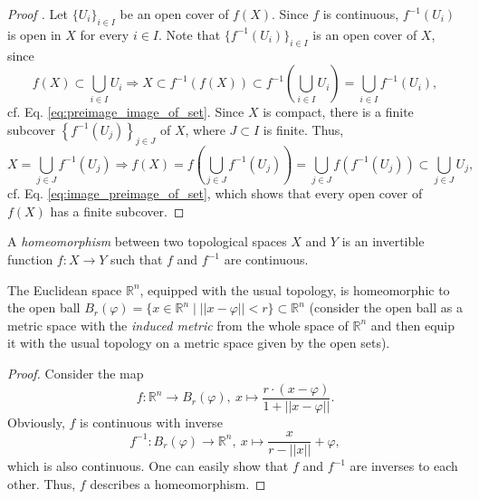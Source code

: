\begin{proof}[Proof \cite{226328}]
	Let $\{U_i\}_{i\in I}$ be an open cover of $f(X)$. Since $f$ is continuous, $f^{-1}(U_i)$ is open in $X$ for every $i\in I$. Note that $\{f^{-1}(U_i)\}_{i\in I}$ is an open cover of $X$, since  $$f(X)\subset \bigcup_{i\in I}U_i\Rightarrow X\subset f^{-1}(f(X))\subset f^{-1}\left(\bigcup_{i\in I}U_i\right) = \bigcup_{i\in I}f^{-1}(U_i),$$ cf. Eq. \eqref{eq:preimage_image_of_set}. Since $X$ is compact, there is a finite subcover $\left\{f^{-1}(U_j)\right\}_{j\in J}$ of $X$, where $J\subset I$ is finite. Thus,
	$$X = \bigcup_{j\in J}f^{-1}(U_j)\Rightarrow f(X) = f\left(\bigcup_{j\in J}f^{-1}(U_j)\right) = \bigcup_{j\in J}f(f^{-1}(U_j))\subset \bigcup_{j\in J}U_j,$$
	cf. Eq. \eqref{eq:image_preimage_of_set}, which shows that every open cover of $f(X)$ has a finite subcover.
\end{proof}

\begin{defn} A \textit{homeomorphism} between two topological spaces $X$ and $Y$ is an invertible function $f: X\rightarrow Y$ such that $f$ and $f^{-1}$ are continuous. 
\end{defn}

\begin{exmp}
	The Euclidean space $\mathbb R^n$, equipped with the usual topology, is homeomorphic to the open ball $B_{r}(\varphi) =  \{x\in\mathbb R^n \mid \lvert\lvert x-\varphi \rvert\rvert < r \} \subset \mathbb R^n$ (consider the open ball as a metric space with the \textit{induced metric} from the whole space of $\mathbb R^n$ and then equip it with the usual topology on a metric space given by the open sets). 
\end{exmp}

\begin{proof}
	Consider the map $$f: \mathbb R^n\rightarrow B_r(\varphi), \ x\mapsto \frac{r\cdot (x-\varphi)}{1+\lvert\lvert x-\varphi\rvert\rvert}.$$ Obviously, $f$ is continuous with inverse $$f^{-1}: B_r(\varphi)\rightarrow \mathbb R^n, \ x \mapsto \frac{x}{r-\lvert\lvert x\rvert\rvert}+\varphi,$$ which is also continuous. One can easily show that $f$ and $f^{-1}$ are inverses to each other. Thus, $f$ describes a homeomorphism. 	
\end{proof}

